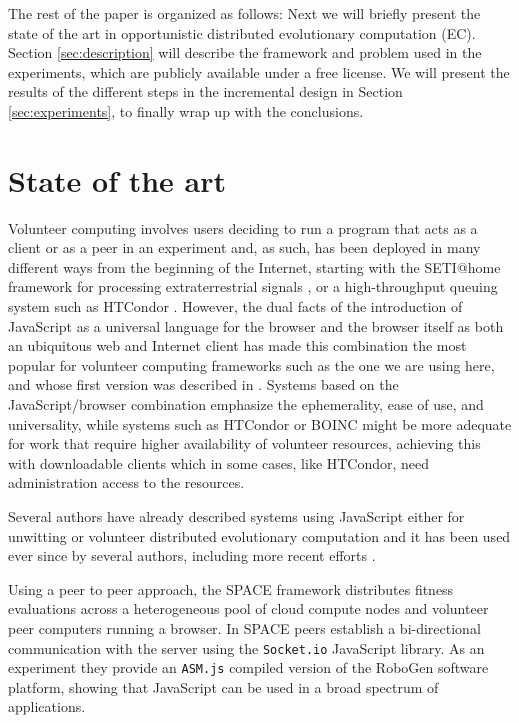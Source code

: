 \documentclass[runningheads,a4paper]{llncs}\usepackage[]{graphicx}\usepackage[]{color}
\begin{document}
The rest of the paper is organized as follows: Next we will briefly
present the state of the art in opportunistic distributed evolutionary
computation (EC). Section \ref{sec:description} will describe the
framework and problem used in the experiments, which are publicly
available under a free license. We will present the results of the
different steps in the incremental design in Section
\ref{sec:experiments}, to finally wrap up with the conclusions. 

\section{State of the art}
\label{sec:soa}

Volunteer computing involves users deciding to run a program that acts
as a client or as a peer in an experiment
and, as such, has been deployed in many different ways from the
beginning of the Internet, starting with the SETI@home framework for
processing extraterrestrial signals \cite{david-seti:home}, or a 
high-throughput queuing system such as HTCondor \cite{HTCondor}.
However,
the dual facts of the introduction of JavaScript as a universal language for the
browser and the browser itself as both an ubiquitous web and Internet client has
made this combination the most popular for volunteer computing
frameworks such as the one we are using here, and whose first version
was described in \cite{DBLP:conf/gecco/GuervosG15anonymous}. Systems based on the
JavaScript/browser combination
emphasize the ephemerality, ease of use, and universality, while
systems such as HTCondor or BOINC might be more adequate for work that %
require higher availability of volunteer resources, achieving this
with downloadable clients which in some cases, like HTCondor, need
administration access to the resources.

Several authors have already described systems using JavaScript  either
for unwitting
\cite{unwitting-ec,boldrin2007distributed} or volunteer 
\cite{langdon:2005:metas,gecco07:workshop:dcor} distributed
evolutionary computation and it has been used ever since by several
authors, including more recent efforts
\cite{duda2013distributed,DBLP:journals/corr/abs-0801-1210,EvoStar2014:jsEO}.

Using a peer to peer approach, the SPACE framework \cite{leclerc2016seamless} distributes fitness 
evaluations across a heterogeneous pool of cloud compute nodes and volunteer
peer computers running a browser. In SPACE peers establish a bi-directional 
communication with the server using the \texttt{Socket.io} JavaScript library.  
As an experiment they provide an \texttt{ASM.js} compiled version of the RoboGen 
software platform, showing that JavaScript can be used in a broad 
spectrum of applications.  
\end{document}
